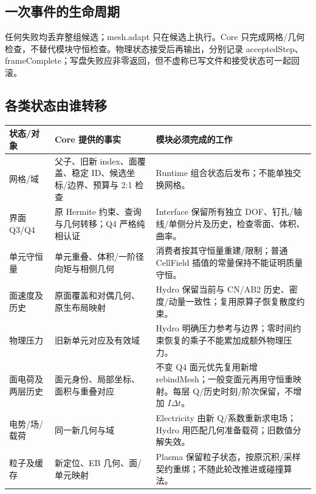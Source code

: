 \documentclass[UTF8,a4paper,11pt,fontset=fandol]{ctexart}
\begin{document}
\subsection{一次事件的生命周期}
\begin{center}
\end{center}
任何失败均丢弃整组候选；mesh.adapt 只在候选上执行。Core 只完成网格/几何检查，不替代模块守恒检查。物理状态接受后再输出，分别记录 acceptedStep、frameComplete；写盘失败应非零返回，但不虚称已写文件和接受状态可一起回滚。

\subsection{各类状态由谁转移}
\begin{longtable}{@{}P{.2\textwidth}P{.38\textwidth}P{.36\textwidth}@{}}
\toprule 状态/对象 & Core 提供的事实 & 模块必须完成的工作\\\midrule\endhead
网格/域 & 父子、旧新 index、面覆盖、稳定 ID、候选坐标/边界、预算与 2:1 检查 & Runtime 组合状态后发布；不能单独交换网格。\\
界面 Q3/Q4 & 原 Hermite 约束、查询与几何转移；Q4 严格纯相认证 & Interface 保留所有独立 DOF、钉扎/轴线/单侧分片及历史，检查零面、体积、曲率。\\
单元守恒量 & 单元重叠、体积/一阶径向矩与相侧几何 & 消费者按其守恒量重建/限制；普通 CellField 插值的常量保持不能证明质量守恒。\\
面速度及历史 & 原面覆盖和对偶几何、原生布局映射 & Hydro 保留当前与 CN/AB2 历史、密度/动量一致性；复用原算子恢复散度约束。\\
物理压力 & 旧新单元对应及有效域 & Hydro 明确压力参考与边界；零时间约束恢复的乘子不能累加成额外物理压力。\\
面电荷及两层历史 & 面元身份、局部坐标、面积与重叠对应 & 不变 Q4 面元优先复用新增 rebindMesh；一般变面元再用守恒重映射。每层 Q/历史时刻/阶次保留，不增加 $I\Delta t$。\\
电势/场/载荷 & 同一新几何与域 & Electricity 由新 Q/系数重新求电场；Hydro 用匹配几何准备载荷；旧数值分解失效。\\
粒子及缓存 & 新定位、EB 几何、面/单元映射 & Plasma 保留粒子状态，按原沉积/采样契约重绑；不随此轮改推进或碰撞算法。\\
\bottomrule
\end{longtable}
\end{document}
